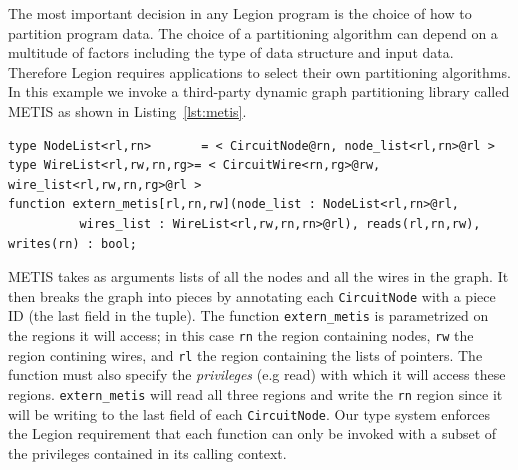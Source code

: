 The most important decision in any Legion program is the choice of
how to partition program data.  The choice of a partitioning algorithm
can depend on a multitude of factors including the type of data structure
and input data.  Therefore
Legion requires applications to select their own partitioning algorithms.
In this example we invoke a third-party dynamic graph partitioning library
called METIS\cite{Metis98} as shown in Listing~\ref{lst:metis}.

\begin{lstlisting}[label={lst:metis},caption={Partition Computation}]
type NodeList<rl,rn>       = < CircuitNode@rn, node_list<rl,rn>@rl >
type WireList<rl,rw,rn,rg>= < CircuitWire<rn,rg>@rw, wire_list<rl,rw,rn,rg>@rl >
function extern_metis[rl,rn,rw](node_list : NodeList<rl,rn>@rl,
          wires_list : WireList<rl,rw,rn,rn>@rl), reads(rl,rn,rw), writes(rn) : bool;
\end{lstlisting}

METIS takes as arguments lists of all the nodes and all the wires in
the graph.  It then breaks the graph into pieces by annotating each 
{\tt CircuitNode} with a piece ID (the last field in the tuple).
The function {\tt extern\_metis} is parametrized on the regions it will
access; in this case {\tt rn} the region containing nodes, {\tt rw} the region
contining wires, and {\tt rl} the region containing the lists of pointers.  The function
must also specify the {\em privileges} (e.g read) with which it will access
these regions.  {\tt extern\_metis} will read all three regions and write
the {\tt rn} region since it will be writing to the last field of each
{\tt CircuitNode}.  Our type system enforces the Legion 
requirement that each function can only be invoked with a subset of the 
privileges contained in its calling context.

